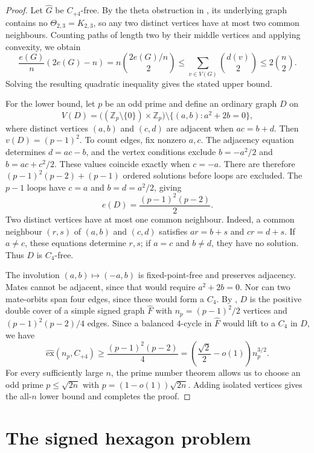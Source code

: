 \documentclass{article}
\newcommand{\ex}{\mathrm{ex}}
\newcommand{\hex}{\widehat{\ex}}
\newcommand{\Z}{\mathbb{Z}}
\theoremstyle{definition}
\theoremstyle{remark}
\begin{document}
\begin{proof}
Let $\widehat G$ be $C_{+4}$-free. By the theta obstruction in
, its underlying graph contains no
$\Theta_{2,3}=K_{2,3}$, so any two distinct vertices have at most two
common neighbours. Counting paths of length two by their middle vertices
and applying convexity, we obtain
\[
\frac{e(G)}n(2e(G)-n)
=n\binom{2e(G)/n}{2}
\leq\sum_{v\in V(G)}\binom{d(v)}2
\leq2\binom n2.
\]
Solving the resulting quadratic inequality gives the stated upper bound.

For the lower bound, let $p$ be an odd prime and define an ordinary graph
$D$ on
\[
V(D)=\bigl((\Z_p\setminus\{0\})\times\Z_p\bigr)
\setminus\{(a,b):a^2+2b=0\},
\]
where distinct vertices $(a,b)$ and $(c,d)$ are adjacent when $ac=b+d$.
Then $v(D)=(p-1)^2$.  To count edges, fix nonzero $a,c$.  The adjacency
equation determines $d=ac-b$, and the vertex conditions exclude
$b=-a^2/2$ and $b=ac+c^2/2$.  These values coincide exactly when $c=-a$.
There are therefore $(p-1)^2(p-2)+(p-1)$ ordered solutions before loops
are excluded.  The $p-1$ loops have $c=a$ and $b=d=a^2/2$, giving
\[
e(D)=\frac{(p-1)^2(p-2)}2.
\]
Two distinct vertices have at most one common neighbour.  Indeed, a common
neighbour $(r,s)$ of $(a,b)$ and $(c,d)$ satisfies $ar=b+s$ and $cr=d+s$.
If $a\ne c$, these equations determine $r,s$; if $a=c$ and $b\ne d$,
they have no solution.  Thus $D$ is $C_4$-free.

The involution $(a,b)\mapsto(-a,b)$ is fixed-point-free and preserves
adjacency.  Mates cannot be adjacent, since that would require
$a^2+2b=0$.  Nor can two mate-orbits span four edges, since these would
form a $C_4$.  By , $D$ is the positive
double cover of a simple signed graph $\widehat F$ with
$n_p=(p-1)^2/2$ vertices and $(p-1)^2(p-2)/4$ edges.  Since a balanced
$4$-cycle in $\widehat F$ would lift to a $C_4$ in $D$, we have
\[
\hex(n_p,C_{+4})\geq\frac{(p-1)^2(p-2)}4
=\left(\frac{\sqrt2}{2}-o(1)\right)n_p^{3/2}.
\]
For every sufficiently large $n$, the prime number theorem \cite{Apostol1976}
allows us to choose an odd prime $p\leq\sqrt{2n}$ with
$p=(1-o(1))\sqrt{2n}$.  Adding isolated vertices gives the all-$n$ lower
bound and completes the proof.
\end{proof}

\section{The signed hexagon problem}\label{sec:hexagons}
\end{document}
